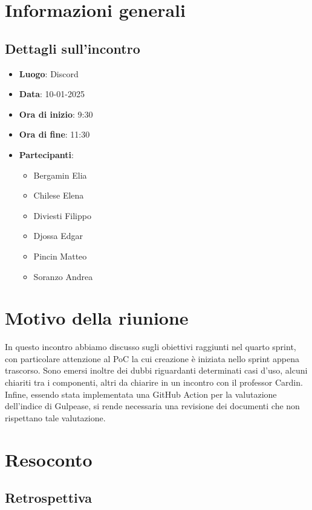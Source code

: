 \section{Informazioni generali}
\subsection{Dettagli sull'incontro}
\begin{itemize}
    \item \textbf{Luogo}: Discord
    \item \textbf{Data}: 10-01-2025
    \item \textbf{Ora di inizio}: 9:30
    \item \textbf{Ora di fine}: 11:30
    \item \textbf{Partecipanti}:
    \begin{itemize}
        \item Bergamin Elia
        \item Chilese Elena
        \item Diviesti Filippo
        \item Djossa Edgar
        \item Pincin Matteo 
        \item Soranzo Andrea  
    \end{itemize}
\end{itemize}

\section{Motivo della riunione}
In questo incontro abbiamo discusso sugli obiettivi raggiunti nel quarto sprint, con particolare attenzione al PoC la cui creazione è iniziata nello sprint appena trascorso. 
Sono emersi inoltre dei dubbi riguardanti determinati casi d'uso, alcuni chiariti tra i componenti, altri da chiarire in un incontro con il professor Cardin.
Infine, essendo stata implementata una GitHub Action per la valutazione dell'indice di Gulpease, si rende necessaria una revisione dei documenti che non rispettano tale valutazione.

\section{Resoconto}
\subsection{Retrospettiva}

